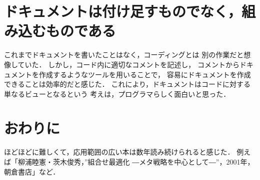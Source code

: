 \documentclass[oneside,a4paper,twocolumn,platex,dvipdfmx]{jarticle}
\begin{document}
\section{ドキュメントは付け足すものでなく，組み込むものである}
これまでドキュメントを書いたことはなく，コーディングとは
別の作業だと想像していた．
しかし，コード内に適切なコメントを記述し，
コメントからドキュメントを作成するようなツールを用いることで，
容易にドキュメントを作成できることは効率的だと感じた．
これにより，ドキュメントはコードに対する単なるビューとなるという
考えは，プログラマらしく面白いと思った．

\section{おわりに}
ほどほどに難しくて，応用範囲の広い本は数年読み続けられると感じた．
例えば「柳浦睦憲・茨木俊秀，''組合せ最適化 ―メタ戦略を中心として―''，2001年，朝倉書店」など．
\end{document}
